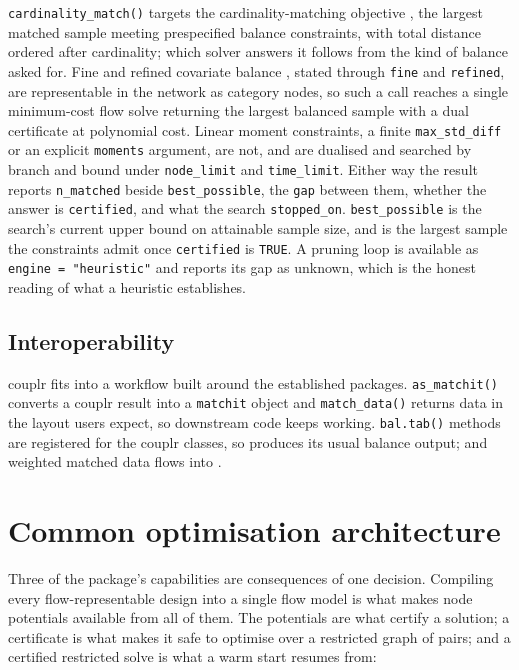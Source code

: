 \texttt{cardinality\_match()} targets the cardinality-matching objective
\citep{Zubizarreta2014}, the largest matched sample meeting prespecified balance
constraints, with total distance ordered after cardinality; which solver answers it follows
from the kind of balance asked for. Fine and refined covariate balance
\citep{RosenbaumRossSilber2007, Pimentel2015}, stated through \texttt{fine} and
\texttt{refined}, are representable in the network as category nodes, so such a call
reaches a single minimum-cost flow solve returning the largest balanced sample
with a dual certificate at polynomial cost. Linear moment constraints, a
finite \texttt{max\_std\_diff} or an explicit \texttt{moments} argument, are not, and are
dualised and searched by branch and bound under \texttt{node\_limit} and \texttt{time\_limit}.
Either way the result reports \texttt{n\_matched} beside \texttt{best\_possible}, the \texttt{gap}
between them, whether the answer is \texttt{certified}, and what the search
\texttt{stopped\_on}. \texttt{best\_possible} is the search's current upper bound on attainable
sample size, and is the largest sample the constraints admit once \texttt{certified}
is \texttt{TRUE}. A pruning loop is available as
\texttt{engine\ =\ "heuristic"} and reports its gap as unknown, which is the honest
reading of what a heuristic establishes.

\subsection{Interoperability}\label{interoperability}

couplr fits into a workflow built around the established packages.
\texttt{as\_matchit()} converts a couplr result into a \texttt{matchit} object and
\texttt{match\_data()} returns data in the layout  users expect, so downstream code keeps working. \texttt{bal.tab()} methods are registered for the
couplr classes, so  produces its usual balance output; and
weighted matched data flows into  \citep{marginaleffects}.

\section{Common optimisation architecture}\label{common-optimisation-architecture}

Three of the package's capabilities are consequences of one decision.
Compiling every flow-representable design into a single flow model is what
makes node potentials available from all of them. The potentials are what certify a solution; a certificate is what makes it safe to optimise over a
restricted graph of pairs; and a certified restricted solve is what a warm start
resumes from:

